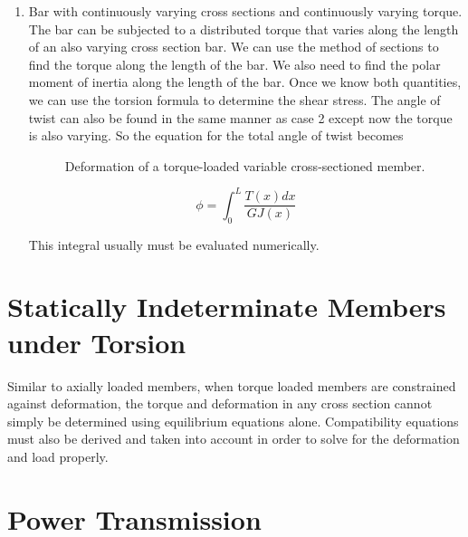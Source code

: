 \documentclass[
10pt,
a4paper,
openany,
svgnames,
]{kaobook} %
\begin{document}
\begin{enumerate}
\item Bar with continuously varying cross sections and continuously varying torque. The bar can be subjected to a distributed torque that varies along the length of an also varying cross section bar. We can use the method of sections to find the torque along the length of the bar. We also need to find the polar moment of inertia along the length of the bar. Once we know both quantities, we can use the torsion formula to determine the shear stress. The angle of twist can also be found in the same manner as case 2 except now the torque is also varying. So the equation for the total angle of twist becomes

    \begin{figure}[h]
    \centering
    \caption{Deformation of a torque-loaded variable cross-sectioned member.}
  \end{figure}
  
  \begin{equation}
    \phi  = \int_0^L \frac{T(x)dx}{G{J(x)}}
  \end{equation}
  
  This integral usually must be evaluated numerically.
\end{enumerate}
  
\section{Statically Indeterminate Members under Torsion}

Similar to axially loaded members, when torque loaded members are constrained against deformation, the torque and deformation in any cross section cannot simply be determined using equilibrium equations alone. Compatibility equations must also be derived and taken into account in order to solve for the deformation and load properly.

\section{Power Transmission}
\end{document}

